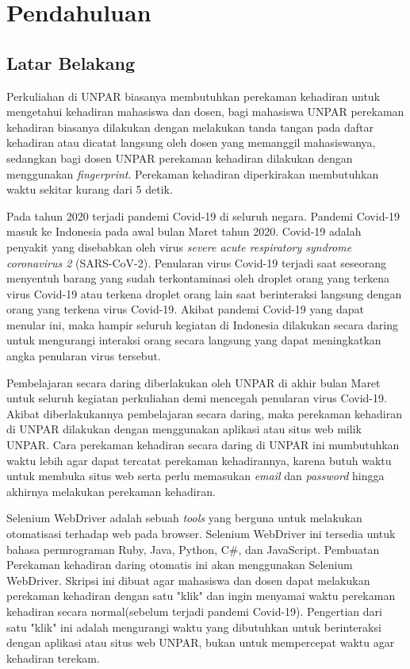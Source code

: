\chapter{Pendahuluan}
\label{chap:intro}
   
\section{Latar Belakang}
\label{sec:label}
Perkuliahan di UNPAR biasanya membutuhkan perekaman kehadiran untuk mengetahui kehadiran mahasiswa dan dosen, bagi mahasiswa UNPAR perekaman kehadiran biasanya dilakukan dengan melakukan tanda tangan pada daftar kehadiran atau dicatat langsung oleh dosen yang memanggil mahasiswanya, sedangkan bagi dosen UNPAR perekaman kehadiran dilakukan dengan menggunakan  \textit{fingerprint}. Perekaman kehadiran diperkirakan membutuhkan waktu sekitar kurang dari 5 detik.

Pada tahun 2020 terjadi pandemi Covid-19 di seluruh negara. Pandemi Covid-19 masuk ke Indonesia pada awal bulan Maret tahun 2020. Covid-19 adalah penyakit yang disebabkan oleh virus \textit{severe acute respiratory syndrome coronavirus 2} (SARS-CoV-2). Penularan virus Covid-19 terjadi saat seseorang menyentuh barang yang sudah terkontaminasi oleh droplet orang yang terkena virus Covid-19 atau terkena droplet orang lain saat berinteraksi langsung dengan orang yang terkena virus Covid-19.  Akibat pandemi Covid-19 yang dapat menular ini, maka hampir seluruh kegiatan di Indonesia dilakukan secara daring untuk mengurangi interaksi orang secara langsung yang dapat meningkatkan angka penularan virus tersebut. 

Pembelajaran secara daring diberlakukan oleh UNPAR di akhir bulan Maret untuk seluruh kegiatan perkuliahan demi mencegah penularan virus Covid-19. Akibat diberlakukannya pembelajaran secara daring, maka perekaman kehadiran di UNPAR dilakukan dengan menggunakan aplikasi atau situs web milik UNPAR. Cara perekaman kehadiran secara daring di UNPAR ini mumbutuhkan waktu lebih agar dapat tercatat perekaman kehadirannya, karena butuh waktu untuk membuka situs web serta perlu memasukan \textit{email} dan \textit{password} hingga akhirnya melakukan perekaman kehadiran. 

Selenium WebDriver adalah sebuah \textit{tools} yang berguna untuk melakukan otomatisasi terhadap web pada browser. Selenium WebDriver ini tersedia untuk bahasa permrograman Ruby, Java, Python, C\#, dan JavaScript. Pembuatan Perekaman kehadiran daring otomatis ini akan menggunakan Selenium WebDriver. Skripsi ini dibuat agar mahasiswa dan dosen dapat melakukan perekaman kehadiran dengan satu "klik" dan ingin menyamai waktu perekaman kehadiran secara normal(sebelum terjadi pandemi Covid-19). Pengertian dari satu "klik" ini adalah mengurangi waktu yang dibutuhkan untuk berinteraksi dengan aplikasi atau situs web UNPAR, bukan untuk mempercepat waktu agar kehadiran terekam. 


